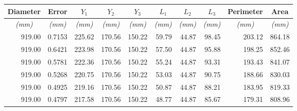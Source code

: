 \begin{table}[t!]
\centering
\begin{tabular}{|r|r|r|r|r|r|r|r|r|r|}
\hline
\multicolumn{1}{|c|}{\textbf{Diameter}} & \multicolumn{1}{c|}{\textbf{Error}} & \multicolumn{1}{c|}{\textbf{$Y_1$}} & \multicolumn{1}{c|}{\textbf{$Y_2$}} & \multicolumn{1}{c|}{\textbf{$Y_3$}} & \multicolumn{1}{c|}{\textbf{$L_1$}} & \multicolumn{1}{c|}{\textbf{$L_2$}} & \multicolumn{1}{c|}{\textbf{$L_3$}} & \multicolumn{1}{c|}{\textbf{Perimeter}} & \multicolumn{1}{c|}{\textbf{Area}} \\ \hline
\multicolumn{1}{|c|}{\textit{(mm)}}     & \multicolumn{1}{c|}{\textit{(mm)}}  & \multicolumn{1}{c|}{\textit{(mm)}}  & \multicolumn{1}{c|}{\textit{(mm)}}  & \multicolumn{1}{c|}{\textit{(mm)}}  & \multicolumn{1}{c|}{\textit{(mm)}}  & \multicolumn{1}{c|}{\textit{(mm)}}  & \multicolumn{1}{c|}{\textit{(mm)}}  & \multicolumn{1}{c|}{\textit{(mm)}}      & \multicolumn{1}{c|}{\textit{(mm)}} \\ \hline
  919.00	&	0.7153	&	225.62	&	170.56	&	150.22	&	59.79	&	44.87	&	98.45	&	203.12	&	864.18	\\ \hline
  919.00	&	0.6421	&	223.98	&	170.56	&	150.22	&	57.50	&	44.87	&	95.88	&	198.25	&	852.46	\\ \hline
  919.00	&	0.5781	&	222.36	&	170.56	&	150.22	&	55.24	&	44.87	&	93.31	&	193.43	&	841.07	\\ \hline
  919.00	&	0.5268	&	220.75	&	170.56	&	150.22	&	53.03	&	44.87	&	90.75	&	188.66	&	830.03	\\ \hline
  919.00	&	0.4925	&	219.16	&	170.56	&	150.22	&	50.87	&	44.87	&	88.21	&	183.95	&	819.33	\\ \hline
  919.00	&	0.4797	&	217.58	&	170.56	&	150.22	&	48.77	&	44.87	&	85.67	&	179.31	&	808.96	\\ \hline

\end{tabular}
\end{table}
